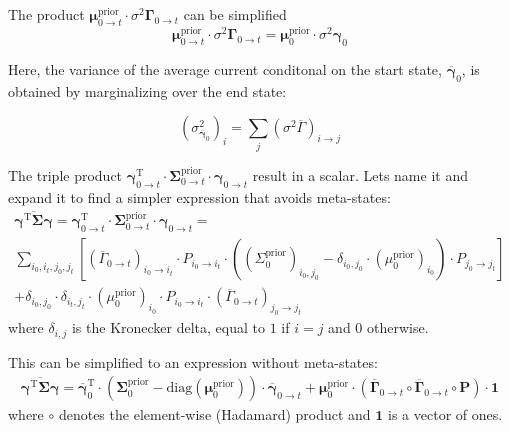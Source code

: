 \documentclass[pdflatex,sn-mathphys-num]{sn-jnl}%
\theoremstyle{thmstyleone}%
\theoremstyle{thmstyletwo}%
\theoremstyle{thmstylethree}%
\begin{document}
The product $\mathbf{\mu}^{\mathrm{prior}}_{0 \rightarrow t} \cdot {\sigma^2 \mathbf{\Gamma}}_{0 \rightarrow t}$ can be simplified
\begin{equation}
	\mathbf{\mu}^{\mathrm{prior}}_{0 \rightarrow t} \cdot {\sigma^2 \mathbf{\Gamma}}_{0 \rightarrow t}= \mathbf{\mu}^{\mathrm{prior}}_{0} \cdot {\sigma^2 \mathbf{\gamma}}_{0}
	\label{eq:meta_channel_noise}
\end{equation}
 
Here, the variance of the average current conditonal on the start state, \( \overline{\mathbf{\gamma}}_{0} \), is obtained by marginalizing over the end state:

\begin{equation}
	(\sigma^2_{\overline{\mathbf{\gamma}}_{0}})_i = \sum_j (\sigma^2 \overline{\Gamma})_{i \rightarrow j}
	\label{eq:sigma_gamma_i}
\end{equation}


The triple product $\mathbf{\gamma}^{\mathrm{T}}_{0 \rightarrow t} \cdot \mathbf{\Sigma}^{\mathrm{prior}}_{0 \rightarrow t} \cdot \mathbf{\gamma}_{0 \rightarrow t}$ result in a scalar. Lets name it and expand it to find a simpler expression that avoids meta-states:
\begin{multline}
	\overline{\mathbf{\gamma}^{\mathrm{T}} \mathbf{\Sigma}\mathbf{\gamma}}=
	\mathbf{\gamma}^{\mathrm{T}}_{0 \rightarrow t} \cdot \mathbf{\Sigma}^{\mathrm{prior}}_{0 \rightarrow t} \cdot \mathbf{\gamma}_{0 \rightarrow t} = \\
	\sum_{i_0, i_t, j_0, j_t} 
	\left[ (\overline{\Gamma}_{0 \rightarrow t})_{i_0 \rightarrow i_t} \cdot P_{i_0 \rightarrow i_t} \cdot \left( (\Sigma^{\mathrm{prior}}_{0})_{i_0, j_0} - \delta_{i_0, j_0} \cdot (\mu^{\mathrm{prior}}_0)_{i_0} \right) \cdot P_{j_0 \rightarrow j_t} \right] \\
	+ \delta_{i_0, j_0} \cdot \delta_{i_t, j_t} \cdot (\mu^{\mathrm{prior}}_0)_{i_0} \cdot P_{i_0 \rightarrow i_t} \cdot (\overline{\Gamma}_{0 \rightarrow t})_{j_0 \rightarrow j_t}
	\label{eq:meta_state_cov_mult}
\end{multline}
where $\delta_{i, j}$ is the Kronecker delta, equal to $1$ if $i = j$ and $0$ otherwise.

This can be simplified to an expression without meta-states:
\begin{multline}
		\overline{\mathbf{\gamma}^{\mathrm{T}} \mathbf{\Sigma}\mathbf{\gamma}}= 
	\overline{\mathbf{\gamma}}_{0}^{\mathrm{T}} \cdot 
	\left( \mathbf{\Sigma}^{\mathrm{prior}}_{0} - \mathrm{diag}(\mathbf{\mu}^{\mathrm{prior}}_0) \right) \cdot 
	\overline{\mathbf{\gamma}}_{0 \rightarrow t} 
	+ \mathbf{\mu}^{\mathrm{prior}}_0 \cdot \left( \overline{\mathbf{\Gamma}}_{0 \rightarrow t} \circ \overline{\mathbf{\Gamma}}_{0 \rightarrow t} \circ \mathbf{P} \right) \cdot \mathbf{1}
	\label{eq:simplified_meta_state}
\end{multline}
where \( \circ \) denotes the element-wise (Hadamard) product and \( \mathbf{1} \) is a vector of ones.
\end{document}
